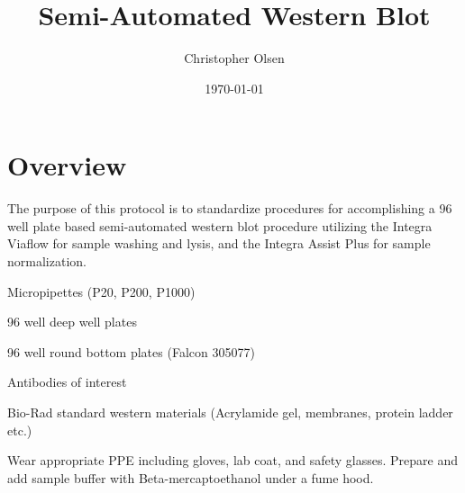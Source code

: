 \documentclass{protocols}
\title{Semi-Automated Western Blot}
\author{Christopher Olsen}
\date{\today}
\begin{document}
	\maketitle
	
	\section{Overview}
	The purpose of this protocol is to standardize procedures for accomplishing a 96 well plate based semi-automated western blot procedure utilizing the Integra Viaflow for sample washing and lysis, and the Integra Assist Plus for sample normalization.
	
	\begin{materials}
		\item Micropipettes (P20, P200, P1000)
		\item 96 well deep well plates
		\item 96 well round bottom plates (Falcon 305077)
		\item Antibodies of interest
		\item Bio-Rad standard western materials (Acrylamide gel, membranes, protein ladder etc.)
	\end{materials}
	
	\begin{safety}
		Wear appropriate PPE including gloves, lab coat, and safety glasses. Prepare and add sample buffer with Beta-mercaptoethanol under a fume hood.
	\end{safety}
	
\end{document}
